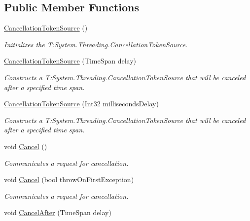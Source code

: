\subsection*{Public Member Functions}
\begin{DoxyCompactItemize}
\item 
\hyperlink{class_system_1_1_threading_1_1_cancellation_token_source_a886124793e6a1c6a893abd6e30a8aff7}{Cancellation\+Token\+Source} ()
\begin{DoxyCompactList}\small\item\em Initializes the T\+:\+System.\+Threading.\+Cancellation\+Token\+Source. \end{DoxyCompactList}\item 
\hyperlink{class_system_1_1_threading_1_1_cancellation_token_source_a5da3070947650baffa2fa6dc9871c0e8}{Cancellation\+Token\+Source} (Time\+Span delay)
\begin{DoxyCompactList}\small\item\em Constructs a T\+:\+System.\+Threading.\+Cancellation\+Token\+Source that will be canceled after a specified time span. \end{DoxyCompactList}\item 
\hyperlink{class_system_1_1_threading_1_1_cancellation_token_source_ae91e609bb47f8bec909153d95d0d2722}{Cancellation\+Token\+Source} (Int32 milliseconds\+Delay)
\begin{DoxyCompactList}\small\item\em Constructs a T\+:\+System.\+Threading.\+Cancellation\+Token\+Source that will be canceled after a specified time span. \end{DoxyCompactList}\item 
void \hyperlink{class_system_1_1_threading_1_1_cancellation_token_source_a1c5aa6f903b7d50df87b7969f9ad10da}{Cancel} ()
\begin{DoxyCompactList}\small\item\em Communicates a request for cancellation. \end{DoxyCompactList}\item 
void \hyperlink{class_system_1_1_threading_1_1_cancellation_token_source_ad4f13dc56fb7ff4633c5059d2870b34b}{Cancel} (bool throw\+On\+First\+Exception)
\begin{DoxyCompactList}\small\item\em Communicates a request for cancellation. \end{DoxyCompactList}\item 
void \hyperlink{class_system_1_1_threading_1_1_cancellation_token_source_a9ece489b439542afe84bf8d8412f6c66}{Cancel\+After} (Time\+Span delay)

\end{DoxyCompactItemize}
